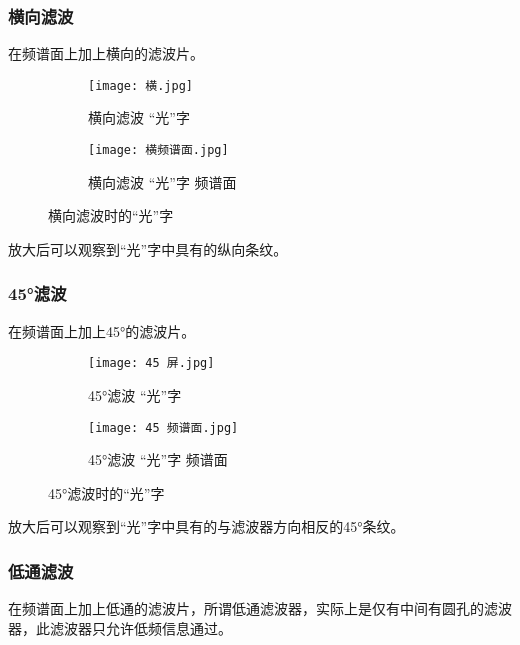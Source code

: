 \documentclass[11pt]{article}
\begin{document}
	\subsubsection{横向滤波}
	
	在频谱面上加上横向的滤波片。
	
	\begin{figure}[H]
		\centering
		\begin{subfigure}[t]{0.45\textwidth}  %
			\centering
			\texttt{[image: 横.jpg]}  %
			\caption{横向滤波 “光”字}
		\end{subfigure}
		\begin{subfigure}[t]{0.45\textwidth}  %
			\centering
			\texttt{[image: 横频谱面.jpg]}  %
			\caption{横向滤波 “光”字 频谱面}
		\end{subfigure}
		\caption{横向滤波时的“光”字}
		\label{fig:横向滤波_光字}
	\end{figure}
	放大后可以观察到“光”字中具有的纵向条纹。
	
	\subsubsection{45°滤波}
	
	在频谱面上加上45°的滤波片。
	
	\begin{figure}[H]
		\centering
		\begin{subfigure}[t]{0.45\textwidth}  %
			\centering
			\texttt{[image: 45 屏.jpg]}  %
			\caption{45°滤波 “光”字}
		\end{subfigure}
		\begin{subfigure}[t]{0.45\textwidth}  %
			\centering
			\texttt{[image: 45 频谱面.jpg]}  %
			\caption{45°滤波 “光”字 频谱面}
		\end{subfigure}
		\caption{45°滤波时的“光”字}
		\label{fig:45滤波_光字}
	\end{figure}
	放大后可以观察到“光”字中具有的与滤波器方向相反的45°条纹。
	
	\subsubsection{低通滤波}
	
	在频谱面上加上低通的滤波片，所谓低通滤波器，实际上是仅有中间有圆孔的滤波器，此滤波器只允许低频信息通过。
	
\end{document}
